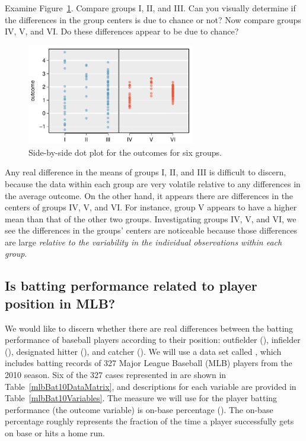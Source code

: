 \begin{example}{Examine Figure~\ref{toyANOVA}. Compare groups I, II, and III. Can you visually determine if the differences in the group centers is due to chance or not? Now compare groups IV, V, and VI. Do these differences appear to be due to chance?}

\begin{figure}[h]
\centering
\includegraphics[width=0.65\textwidth]{05/figures/toyANOVA/toyANOVA}
\caption{Side-by-side dot plot for the outcomes for six groups.}
\label{toyANOVA}
\end{figure}

Any real difference in the means of groups I, II, and III is difficult to discern, because the data within each group are very volatile relative to any differences in the average outcome. On the other hand, it appears there are differences in the centers of groups IV, V, and VI. For instance, group V appears to have a higher mean than that of the other two groups. Investigating groups IV, V, and VI, we see the differences in the groups' centers are noticeable because those differences are large \emph{relative to the variability in the individual observations within each group}.
\end{example}


\subsection{Is batting performance related to player position in MLB?}


We would like to discern whether there are real differences between the batting performance of baseball players according to their position: outfielder (), infielder (), designated hitter (), and catcher (). We will use a data set called , which includes batting records of 327 Major League Baseball (MLB) players from the 2010 season. Six of the 327 cases represented in  are shown in Table~\ref{mlbBat10DataMatrix}, and descriptions for each variable are provided in Table~\ref{mlbBat10Variables}. The measure we will use for the player batting performance (the outcome variable) is on-base percentage (). The on-base percentage roughly represents the fraction of the time a player successfully gets on base or hits a home run.

